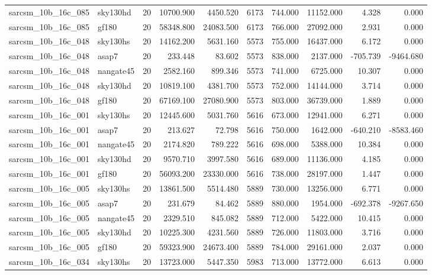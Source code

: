 \begin{longtable}{llrrrrrrrr}
sarcsm\_10b\_16c\_085 & sky130hd & 20 & 10700.900 & 4450.520 & 6173 & 744.000 & 11152.000 & 4.328 & 0.000 \\
sarcsm\_10b\_16c\_085 & gf180 & 20 & 58348.800 & 24083.500 & 6173 & 766.000 & 27092.000 & 2.931 & 0.000 \\
sarcsm\_10b\_16c\_048 & sky130hs & 20 & 14162.200 & 5631.160 & 5573 & 755.000 & 16437.000 & 6.172 & 0.000 \\
sarcsm\_10b\_16c\_048 & asap7 & 20 & 233.448 & 83.602 & 5573 & 838.000 & 2137.000 & -705.739 & -9464.680 \\
sarcsm\_10b\_16c\_048 & nangate45 & 20 & 2582.160 & 899.346 & 5573 & 741.000 & 6725.000 & 10.307 & 0.000 \\
sarcsm\_10b\_16c\_048 & sky130hd & 20 & 10819.100 & 4381.700 & 5573 & 752.000 & 14144.000 & 3.714 & 0.000 \\
sarcsm\_10b\_16c\_048 & gf180 & 20 & 67169.100 & 27080.900 & 5573 & 803.000 & 36739.000 & 1.889 & 0.000 \\
sarcsm\_10b\_16c\_001 & sky130hs & 20 & 12445.600 & 5031.760 & 5616 & 673.000 & 12941.000 & 6.271 & 0.000 \\
sarcsm\_10b\_16c\_001 & asap7 & 20 & 213.627 & 72.798 & 5616 & 750.000 & 1642.000 & -640.210 & -8583.460 \\
sarcsm\_10b\_16c\_001 & nangate45 & 20 & 2174.820 & 789.222 & 5616 & 698.000 & 5388.000 & 10.384 & 0.000 \\
sarcsm\_10b\_16c\_001 & sky130hd & 20 & 9570.710 & 3997.580 & 5616 & 689.000 & 11136.000 & 4.185 & 0.000 \\
sarcsm\_10b\_16c\_001 & gf180 & 20 & 56093.200 & 23330.000 & 5616 & 738.000 & 28197.000 & 1.447 & 0.000 \\
sarcsm\_10b\_16c\_005 & sky130hs & 20 & 13861.500 & 5514.480 & 5889 & 730.000 & 13256.000 & 6.771 & 0.000 \\
sarcsm\_10b\_16c\_005 & asap7 & 20 & 231.679 & 84.462 & 5889 & 880.000 & 1954.000 & -692.378 & -9267.650 \\
sarcsm\_10b\_16c\_005 & nangate45 & 20 & 2329.510 & 845.082 & 5889 & 712.000 & 5422.000 & 10.415 & 0.000 \\
sarcsm\_10b\_16c\_005 & sky130hd & 20 & 10225.300 & 4231.560 & 5889 & 726.000 & 11803.000 & 3.716 & 0.000 \\
sarcsm\_10b\_16c\_005 & gf180 & 20 & 59323.900 & 24673.400 & 5889 & 784.000 & 29161.000 & 2.037 & 0.000 \\
sarcsm\_10b\_16c\_034 & sky130hs & 20 & 13723.000 & 5447.350 & 5983 & 713.000 & 13772.000 & 6.613 & 0.000 \\

\end{longtable}
